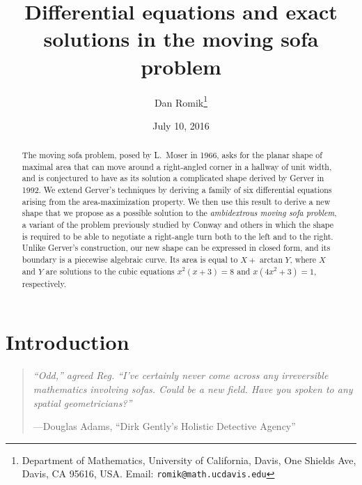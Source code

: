\documentclass[11pt]{article}
\title{Differential equations and exact solutions in the moving sofa problem}
\author{Dan Romik\footnote{Department of Mathematics, University of California, Davis, One Shields Ave, Davis, CA 95616, USA. Email: \texttt{romik@math.ucdavis.edu}}}
\date{July 10, 2016}
\begin{document}
\maketitle

\begin{abstract}
The moving sofa problem, posed by L.~Moser in 1966, asks for the planar shape of maximal area that can move around a right-angled corner in a hallway of unit width, and is conjectured to have as its solution a complicated shape derived by Gerver in 1992. We extend Gerver's techniques by deriving a family of six differential equations arising from the area-maximization property. We then use this result to derive a new shape that we propose as a possible solution to the \emph{ambidextrous moving sofa problem}, a variant of the problem previously studied by Conway and others in which the shape is required to be able to negotiate a right-angle turn both to the left and to the right. Unlike Gerver's construction, our new shape can be expressed in closed form, and its boundary is a piecewise algebraic curve. 
Its area is equal to $X+\arctan Y$, where $X$ and $Y$ are solutions to the cubic equations $x^2(x+3)=8$ and $x(4x^2+3)=1$, respectively.
\end{abstract}

\renewcommand{\thefootnote}{\fnsymbol{footnote}} 
\renewcommand{\thefootnote}{\arabic{footnote}} 


\section{Introduction}

\label{sec:introduction}

\begin{quote}
\textit{``Odd,'' agreed Reg. ``I've certainly never come across any irreversible mathematics involving sofas. Could be a new field. Have you spoken to any spatial geometricians?''}

\hfill ---Douglas Adams, ``Dirk Gently's Holistic Detective Agency'' \\[13pt]
\end{quote}
\end{document}
